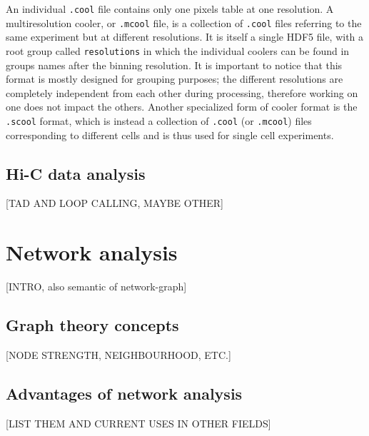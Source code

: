 An individual \texttt{.cool} file contains only one pixels table at one resolution. A multiresolution cooler, or \texttt{.mcool} file, is a collection of \texttt{.cool} files referring to the same experiment but at different resolutions. It is itself a single HDF5 file, with a root group called \texttt{resolutions} in which the individual coolers can be found in groups names after the binning resolution. It is important to notice that this format is mostly designed for grouping purposes; the different resolutions are completely independent from each other during processing, therefore working on one does not impact the others. Another specialized form of cooler format is the \texttt{.scool} format, which is instead a collection of \texttt{.cool} (or \texttt{.mcool}) files corresponding to different cells and is thus used for single cell experiments. 





\subsection{Hi-C data analysis}
[TAD AND LOOP CALLING, MAYBE OTHER]


\section{Network analysis}

[INTRO, also semantic of network-graph]

\subsection{Graph theory concepts}
[NODE STRENGTH, NEIGHBOURHOOD, ETC.]

\subsection{Advantages of network analysis}
[LIST THEM AND CURRENT USES IN OTHER FIELDS]

